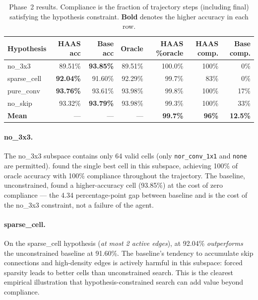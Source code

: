 \begin{table}[t]
\caption{Phase~2 results. Compliance is the fraction of trajectory steps
         (including final) satisfying the hypothesis constraint.
         \textbf{Bold} denotes the higher accuracy in each row.}
\label{tab:phase2-main}
\begin{center}
\small
\begin{tabular}{lrrrrrr}
\toprule
\textbf{Hypothesis} & \textbf{HAAS acc} & \textbf{Base acc} &
                      \textbf{Oracle} & \textbf{HAAS \%oracle} &
                      \textbf{HAAS comp.} & \textbf{Base comp.} \\
\midrule
no\_3x3      & 89.51\% & \textbf{93.85\%} & 89.51\% & 100.0\% & 100\% &  0\% \\
sparse\_cell & \textbf{92.04\%} & 91.60\% & 92.29\% & 99.7\% &  83\% &  0\% \\
pure\_conv   & \textbf{93.76\%} & 93.61\% & 93.98\% & 99.8\% & 100\% & 17\% \\
no\_skip     & 93.32\% & \textbf{93.79\%} & 93.98\% & 99.3\% & 100\% & 33\% \\
\midrule
\textbf{Mean} & --- & --- & --- & \textbf{99.7\%} & \textbf{96\%} & \textbf{12.5\%} \\
\bottomrule
\end{tabular}
\end{center}
\end{table}

\paragraph{no\_3x3.}
The no\_3x3 subspace contains only 64 valid cells (only \texttt{nor\_conv\_1x1}
and \texttt{none} are permitted). \haas{} found the single best cell in this
subspace, achieving 100\% of oracle accuracy with 100\% compliance throughout
the trajectory. The baseline, unconstrained, found a higher-accuracy cell
(93.85\%) at the cost of zero compliance --- the 4.34 percentage-point gap
between baseline and \haas{} is the cost of the no\_3x3 constraint, not
a failure of the agent.

\paragraph{sparse\_cell.}
On the sparse\_cell hypothesis (\textit{at most 2 active edges}), \haas{} at
92.04\% \emph{outperforms} the unconstrained baseline at 91.60\%. The baseline's
tendency to accumulate skip connections and high-density edges is actively harmful
in this subspace: forced sparsity leads to better cells than unconstrained search.
This is the clearest empirical illustration that hypothesis-constrained search can
add value beyond compliance.

